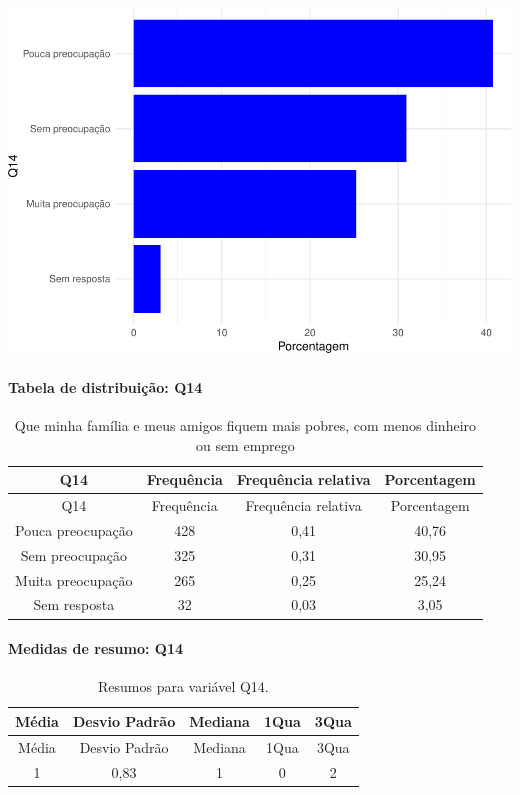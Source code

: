 \documentclass[]{article}
\let\oldparagraph\paragraph
\renewcommand{\paragraph}[1]{\oldparagraph{#1}\mbox{}}
\begin{document}
\begin{center}\includegraphics[width=0.75\linewidth]{relatorio_teste_files/figure-latex/unnamed-chunk-9-1} \end{center}

\hypertarget{tabela-de-distribuiuxe7uxe3o-q14}{%
\paragraph{Tabela de distribuição: Q14}\label{tabela-de-distribuiuxe7uxe3o-q14}}

\begin{longtable}[]{@{}cccc@{}}
\caption{\label{tab:unnamed-chunk-10}Que minha família e meus amigos fiquem mais pobres, com menos dinheiro ou sem emprego}\tabularnewline
\toprule
Q14 & Frequência & Frequência relativa & Porcentagem\tabularnewline
\midrule
\endfirsthead
\toprule
Q14 & Frequência & Frequência relativa & Porcentagem\tabularnewline
\midrule
\endhead
Pouca preocupação & 428 & 0,41 & 40,76\tabularnewline
Sem preocupação & 325 & 0,31 & 30,95\tabularnewline
Muita preocupação & 265 & 0,25 & 25,24\tabularnewline
Sem resposta & 32 & 0,03 & 3,05\tabularnewline
\bottomrule
\end{longtable}

\hypertarget{medidas-de-resumo-q14}{%
\paragraph{Medidas de resumo: Q14}\label{medidas-de-resumo-q14}}

\begin{longtable}[]{@{}ccccc@{}}
\caption{\label{tab:unnamed-chunk-11}Resumos para variável Q14.}\tabularnewline
\toprule
Média & Desvio Padrão & Mediana & 1Qua & 3Qua\tabularnewline
\midrule
\endfirsthead
\toprule
Média & Desvio Padrão & Mediana & 1Qua & 3Qua\tabularnewline
\midrule
\endhead
1 & 0,83 & 1 & 0 & 2\tabularnewline
\bottomrule
\end{longtable}
\end{document}
